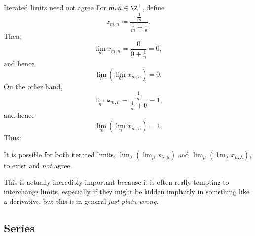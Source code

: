 \begin{exm}{Iterated limits need not agree}{}
For $m,n\in \Z ^+$, define
\begin{equation}
x_{m,n}\coloneqq \frac{\tfrac{1}{m}}{\tfrac{1}{m}+\tfrac{1}{n}}.
\end{equation}
Then,
\begin{equation}
\lim _mx_{m,n}=\frac{0}{0+\tfrac{1}{n}}=0,
\end{equation}
and hence
\begin{equation}
\lim _n\left( \lim _mx_{m,n}\right) =0.
\end{equation}
On the other hand,
\begin{equation}
\lim _nx_{m,n}=\frac{\tfrac{1}{m}}{\tfrac{1}{m}+0}=1,
\end{equation}
and hence
\begin{equation}
\lim _m\left( \lim _nx_{m,n}\right) =1.
\end{equation}
Thus:
\begin{displayquote}
It is possible for both iterated limits, $\lim _\lambda \left( \lim _\mu x_{\lambda ,\mu}\right)$ and $\lim _\mu \left( \lim _\lambda x_{\mu ,\lambda}\right)$, to exist and \emph{not} agree.
\end{displayquote}
\begin{rmk}
This is actually incredibly important because it is often really tempting to interchange limits, especially if they might be hidden implicitly in something like a derivative, but this is in general \emph{just plain wrong}.
\end{rmk}
\end{exm}

\subsection{Series}\label{sbs3.3.5}

